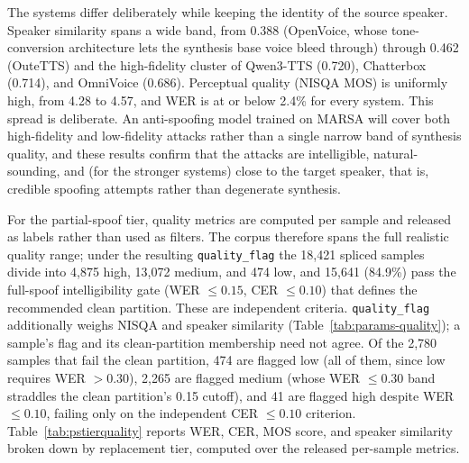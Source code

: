 \documentclass[11pt]{report}
\begin{document}
The systems differ deliberately while keeping the identity of the
source speaker. Speaker similarity spans a wide band, from 0.388
(OpenVoice, whose tone-conversion architecture lets the synthesis base
voice bleed through) through 0.462 (OuteTTS) and the high-fidelity
cluster of Qwen3-TTS (0.720), Chatterbox (0.714), and OmniVoice
(0.686). Perceptual quality (NISQA MOS) is uniformly high, from 4.28 to
4.57, and WER is at or below 2.4\% for every system. This spread is
deliberate. An anti-spoofing model trained on MARSA will cover both
high-fidelity and low-fidelity attacks rather than a single narrow band
of synthesis quality, and these results confirm that the attacks are
intelligible, natural-sounding, and (for the stronger systems) close to
the target speaker, that is, credible spoofing attempts rather than
degenerate synthesis.

For the partial-spoof tier, quality metrics are computed per sample and
released as labels rather than used as filters. The corpus therefore
spans the full realistic quality range; under the resulting
\texttt{quality\_flag} the 18{,}421 spliced samples divide into 4{,}875
high, 13{,}072 medium, and 474 low, and 15{,}641 (84.9\%) pass the
full-spoof intelligibility gate (WER $\leq 0.15$, CER $\leq 0.10$) that
defines the recommended clean partition. These are independent
criteria. \texttt{quality\_flag} additionally weighs NISQA
and speaker similarity (Table~\ref{tab:params-quality}); a sample's
flag and its clean-partition membership need not agree. Of the 2{,}780
samples that fail the clean partition, 474 are flagged low (all of
them, since low requires WER $>0.30$), 2{,}265 are flagged medium
(whose WER $\leq 0.30$ band straddles the clean partition's 0.15
cutoff), and 41 are flagged high despite WER $\leq 0.10$, failing only
on the independent CER $\leq 0.10$ criterion.
Table~\ref{tab:pstierquality}
reports WER, CER, MOS score, and speaker similarity broken down by
replacement tier, computed over the released per-sample metrics.
\end{document}
